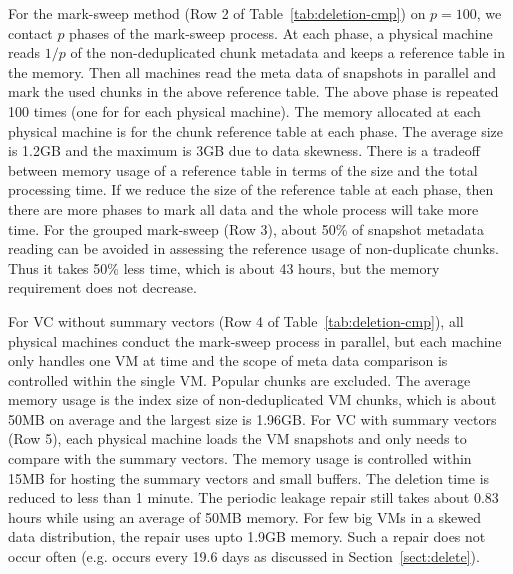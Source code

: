 For the mark-sweep method (Row 2 of Table~\ref{tab:deletion-cmp}) 
on $p=100$, we contact $p$ phases of the mark-sweep process.
At each phase, a physical machine 
reads $1/p$ of the non-deduplicated chunk metadata
and keeps a reference table in the memory.
Then all machines read the meta data 
of snapshots in parallel and mark the used chunks
in the above reference table.
The above phase is repeated 100 times (one for for each physical machine).
The memory allocated at each physical machine is for the 
chunk reference table at each phase. The average size is 1.2GB and the maximum is
3GB due to data skewness.  
There is a tradeoff between memory usage of a reference table in terms of the size
and the total processing time. If we reduce the size of  the reference table at each phase, 
then there are more phases to mark all data and the whole process  will take more time.
For the grouped mark-sweep (Row 3), about 50\% of snapshot metadata reading can be 
avoided in assessing the reference usage of non-duplicate chunks. 
Thus it takes 50\% less time, which is about 43 hours, but the 
memory requirement does not decrease.

For VC without summary vectors (Row 4 of Table~\ref{tab:deletion-cmp}), 
all physical machines conduct the mark-sweep process in parallel, 
but each machine only handles one VM at time and 
the scope of meta data comparison is controlled within the single VM.
Popular chunks are excluded. The average memory usage is the index size of 
non-deduplicated VM chunks, which is about 50MB on average and the largest
size is 1.96GB. 
For VC with summary vectors (Row 5), each physical machine loads
the VM snapshots and only needs to compare with the summary vectors.
The memory usage is controlled within 15MB for hosting the summary vectors
and small buffers. The deletion time is reduced to less than 1 minute.
The periodic leakage repair still takes about 0.83 hours while using
an average of 50MB memory. For  few big VMs in a skewed data distribution,
the repair uses upto 1.9GB memory.
Such a repair does not occur often (e.g. occurs every 19.6 days as discussed in Section~\ref{sect:delete}). 



